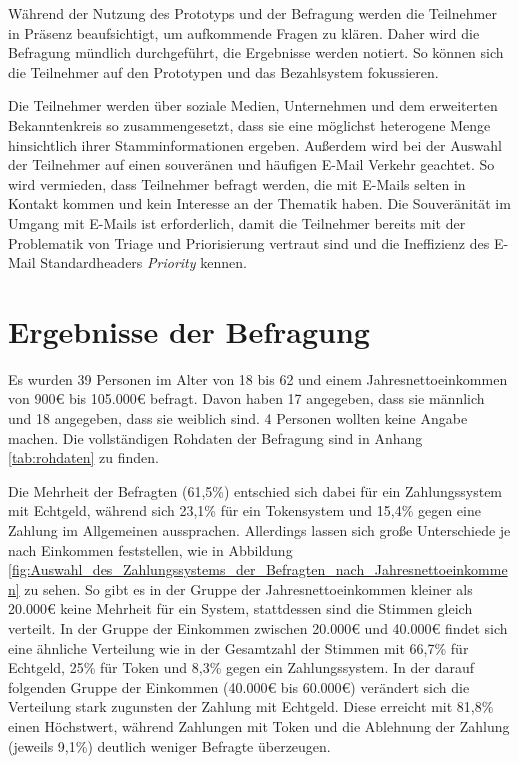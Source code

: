 Während der Nutzung des Prototyps und der Befragung werden die Teilnehmer in Präsenz beaufsichtigt, um aufkommende Fragen zu klären. Daher wird die Befragung mündlich durchgeführt, die Ergebnisse werden notiert. So können sich die Teilnehmer auf den Prototypen und das Bezahlsystem fokussieren.

\noindent Die Teilnehmer werden über soziale Medien, Unternehmen und dem erweiterten Bekanntenkreis so zusammengesetzt, dass sie eine möglichst heterogene Menge hinsichtlich ihrer Stamminformationen ergeben. Außerdem wird bei der Auswahl der Teilnehmer auf einen souveränen und häufigen E-Mail Verkehr geachtet. So wird vermieden, dass Teilnehmer befragt werden, die mit E-Mails selten in Kontakt kommen und kein Interesse an der Thematik haben. Die Souveränität im Umgang mit E-Mails ist erforderlich, damit die Teilnehmer bereits mit der Problematik von Triage und Priorisierung vertraut sind und die Ineffizienz des E-Mail Standardheaders \textit{Priority} kennen.

\section{Ergebnisse der Befragung}
\label{Ergebnisse_der_Befragung}
Es wurden 39 Personen im Alter von 18 bis 62 und einem Jahresnettoeinkommen von 900€ bis 105.000€ befragt. Davon haben 17 angegeben, dass sie männlich und 18 angegeben, dass sie weiblich sind. 4 Personen wollten keine Angabe machen. Die vollständigen Rohdaten der Befragung sind in Anhang \ref{tab:rohdaten} zu finden.

Die Mehrheit der Befragten (61,5\%) entschied sich dabei für ein Zahlungssystem mit Echtgeld, während sich 23,1\% für ein Tokensystem und 15,4\% gegen eine Zahlung im Allgemeinen aussprachen. Allerdings lassen sich große Unterschiede je nach Einkommen feststellen, wie in Abbildung \ref{fig:Auswahl_des_Zahlungssystems_der_Befragten_nach_Jahresnettoeinkommen} zu sehen. So gibt es in der Gruppe der Jahresnettoeinkommen kleiner als 20.000€ keine Mehrheit für ein System, stattdessen sind die Stimmen gleich verteilt. In der Gruppe der Einkommen zwischen 20.000€ und 40.000€ findet sich eine ähnliche Verteilung wie in der Gesamtzahl der Stimmen mit 66,7\% für Echtgeld, 25\% für Token und 8,3\% gegen ein Zahlungssystem. In der darauf folgenden Gruppe der Einkommen (40.000€ bis 60.000€) verändert sich die Verteilung stark zugunsten der Zahlung mit Echtgeld. Diese erreicht mit 81,8\% einen Höchstwert, während Zahlungen mit Token und die Ablehnung der Zahlung (jeweils 9,1\%) deutlich weniger Befragte überzeugen.

